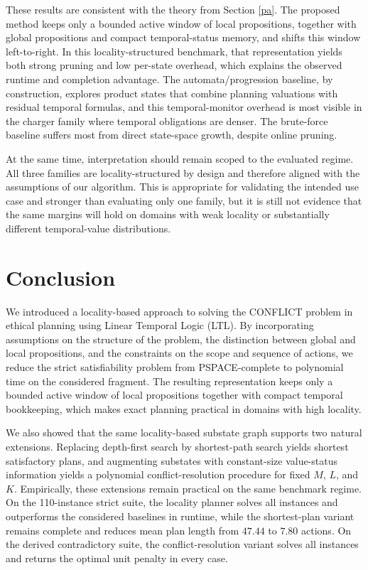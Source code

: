 \documentclass[]{jair}
\begin{document}
These results are consistent with the theory from Section \ref{pa}. The proposed method keeps only a bounded active window of local propositions, together with global propositions and compact temporal-status memory, and shifts this window left-to-right. In this locality-structured benchmark, that representation yields both strong pruning and low per-state overhead, which explains the observed runtime and completion advantage. The automata/progression baseline, by construction, explores product states that combine planning valuations with residual temporal formulas, and this temporal-monitor overhead is most visible in the charger family where temporal obligations are denser. The brute-force baseline suffers most from direct state-space growth, despite online pruning.

At the same time, interpretation should remain scoped to the evaluated regime. All three families are locality-structured by design and therefore aligned with the assumptions of our algorithm. This is appropriate for validating the intended use case and stronger than evaluating only one family, but it is still not evidence that the same margins will hold on domains with weak locality or substantially different temporal-value distributions. %

\section{Conclusion}\label{conc}

We introduced a locality-based approach to solving the CONFLICT problem in ethical planning using Linear Temporal Logic (LTL). By incorporating assumptions on the structure of the problem, the distinction between global and local propositions, and the constraints on the scope and sequence of actions, we reduce the strict satisfiability problem from PSPACE-complete to polynomial time on the considered fragment. The resulting representation keeps only a bounded active window of local propositions together with compact temporal bookkeeping, which makes exact planning practical in domains with high locality.

We also showed that the same locality-based substate graph supports two natural extensions. Replacing depth-first search by shortest-path search yields shortest satisfactory plans, and augmenting substates with constant-size value-status information yields a polynomial conflict-resolution procedure for fixed $M$, $L$, and $K$. Empirically, these extensions remain practical on the same benchmark regime. On the 110-instance strict suite, the locality planner solves all instances and outperforms the considered baselines in runtime, while the shortest-plan variant remains complete and reduces mean plan length from $47.44$ to $7.80$ actions. On the derived contradictory suite, the conflict-resolution variant solves all instances and returns the optimal unit penalty in every case.
\end{document}
